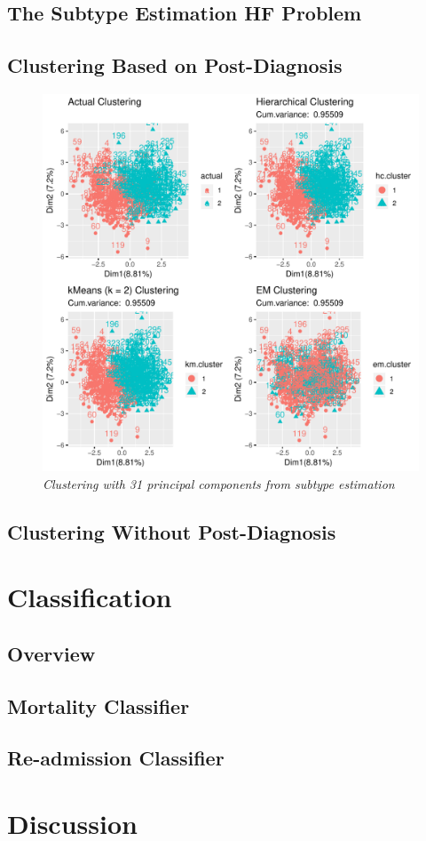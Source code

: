 \documentclass[../thesis.tex]{subfiles}
\begin{document}
\subsection{The Subtype Estimation HF Problem}

\subsection{Clustering Based on Post-Diagnosis}

\begin{figure}
    \centering
    \includegraphics[width=1.2\textwidth]{doc/thesis/images/clustFull.pdf}
    \caption{\textit{Clustering with 31 principal components from subtype estimation}}
    \label{fig:clust_fulle}
\end{figure}

\subsection{Clustering Without Post-Diagnosis}

\section{Classification}

\subsection{Overview}

\subsection{Mortality Classifier}

\subsection{Re-admission Classifier}

\section{Discussion}
\end{document}
